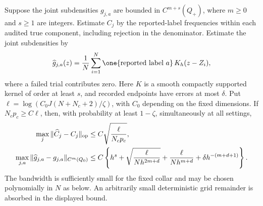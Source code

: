 \begin{lemma}
\label{lem:v80-raw-estimation}
Suppose the joint subdensities $g_{j,a}$ are bounded in
$C^{m+s}(Q_+)$, where $m\ge0$ and $s\ge1$ are integers.
Estimate $C_j$ by the reported-label frequencies within each audited
true component, including rejection in the denominator.  Estimate the
joint subdensities by
\[
 \widehat g_{j,a}(z)=\frac1N\sum_{i=1}^N
       \one\{\text{reported label }a\}\,K_h(z-Z_i),
\]
where a failed trial contributes zero.  Here $K$ is a smooth compactly
supported kernel of order at least $s$, and recorded endpoints have
errors at most $\delta$.  Put
$\ell=\log(C_0J(N+N_c+2)/\zeta)$, with $C_0$ depending on the
fixed dimensions.  If $N_cp_c\ge C\ell$, then, with probability
at least $1-\zeta$, simultaneously at all settings,
\begin{align}
 \max_j\|\widehat C_j-C_j\|_{\rm op}
       &\le C\sqrt{\frac{\ell}{N_cp_c}},
                     \label{eq:v80-calibration-rate}\\
 \max_{j,a}\|\widehat g_{j,a}-g_{j,a}\|_{C^m(Q_0)}
       &\le C\left\{h^s+
          \sqrt{\frac{\ell}{Nh^{2m+d}}}
          +\frac{\ell}{Nh^{m+d}}
          +\delta h^{-(m+d+1)}\right\}.
                     \label{eq:v80-raw-density-rate}
\end{align}
The bandwidth is sufficiently small for the fixed collar and may be
chosen polynomially in $N$ as below.  An arbitrarily small deterministic
grid remainder is absorbed in the displayed bound.
\end{lemma}

